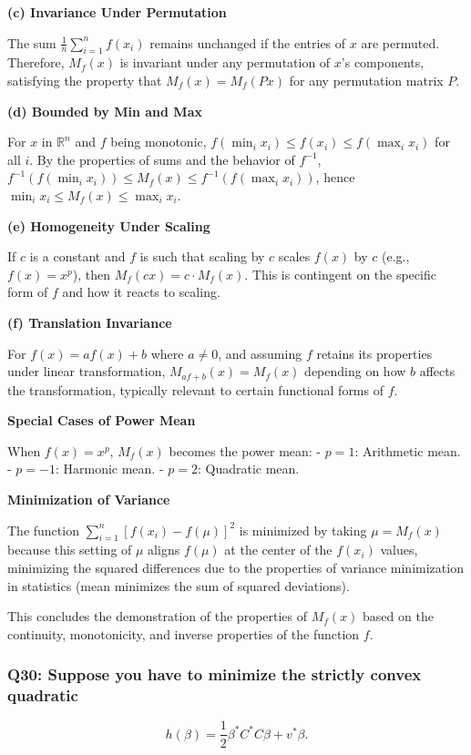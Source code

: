 \documentclass[8pt]{article}
\begin{document}
\textbf{(c) Invariance Under Permutation}

The sum \( \frac{1}{n} \sum_{i=1}^n f(x_i) \) remains unchanged if the entries of \( x \) are permuted. Therefore, \( M_f(x) \) is invariant under any permutation of \( x \)'s components, satisfying the property that \( M_f(x) = M_f(Px) \) for any permutation matrix \( P \).

\textbf{(d) Bounded by Min and Max}

For \( x \) in \( \mathbb{R}^n \) and \( f \) being monotonic, \( f(\min_i x_i) \leq f(x_i) \leq f(\max_i x_i) \) for all \( i \). By the properties of sums and the behavior of \( f^{-1} \), \( f^{-1}(f(\min_i x_i)) \leq M_f(x) \leq f^{-1}(f(\max_i x_i)) \), hence \( \min_i x_i \leq M_f(x) \leq \max_i x_i \).

\textbf{(e) Homogeneity Under Scaling}

If \( c \) is a constant and \( f \) is such that scaling by \( c \) scales \( f(x) \) by \( c \) (e.g., \( f(x) = x^p \)), then \( M_f(cx) = c \cdot M_f(x) \). This is contingent on the specific form of \( f \) and how it reacts to scaling.

\textbf{(f) Translation Invariance}

For \( f(x) = af(x) + b \) where \( a \neq 0 \), and assuming \( f \) retains its properties under linear transformation, \( M_{af+b}(x) = M_f(x) \) depending on how \( b \) affects the transformation, typically relevant to certain functional forms of \( f \).

\textbf{Special Cases of Power Mean}

When \( f(x) = x^p \), \( M_f(x) \) becomes the power mean:
- \( p = 1 \): Arithmetic mean.
- \( p = -1 \): Harmonic mean.
- \( p = 2 \): Quadratic mean.

\textbf{Minimization of Variance}

The function \( \sum_{i=1}^n [f(x_i) - f(\mu)]^2 \) is minimized by taking \( \mu = M_f(x) \) because this setting of \( \mu \) aligns \( f(\mu) \) at the center of the \( f(x_i) \) values, minimizing the squared differences due to the properties of variance minimization in statistics (mean minimizes the sum of squared deviations).

This concludes the demonstration of the properties of \( M_f(x) \) based on the continuity, monotonicity, and inverse properties of the function \( f \).

\subsubsection*{Q30: Suppose you have to minimize the strictly convex quadratic}
\[
h(\beta) = \frac{1}{2} \beta^* C^* C \beta + v^* \beta.
\]
\end{document}
